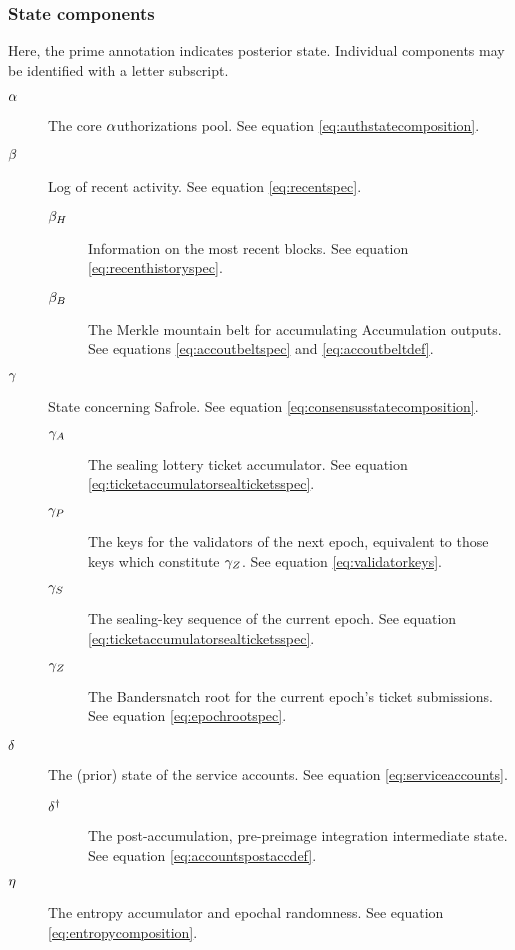 \subsubsection{State components}

Here, the prime annotation indicates posterior state. Individual components may be identified with a letter subscript.
\begin{description}
  \item[$\alpha$] The core $\alpha$uthorizations pool. See equation \ref{eq:authstatecomposition}.
  \item[$\beta$] Log of recent activity. See equation \ref{eq:recentspec}.
  \begin{description}
    \item[$\beta_H$] Information on the most recent blocks. See equation \ref{eq:recenthistoryspec}.
    \item[$\beta_B$] The Merkle mountain belt for accumulating Accumulation outputs. See equations \ref{eq:accoutbeltspec} and \ref{eq:accoutbeltdef}.
  \end{description}
  \item[$\gamma$] State concerning Safrole. See equation \ref{eq:consensusstatecomposition}.
  \begin{description}
    \item[$\gamma_A$] The sealing lottery ticket accumulator. See equation \ref{eq:ticketaccumulatorsealticketsspec}.
    \item[$\gamma_P$] The keys for the validators of the next epoch, equivalent to those keys which constitute $\gamma_Z$. See equation \ref{eq:validatorkeys}.
    \item[$\gamma_S$] The sealing-key sequence of the current epoch. See equation \ref{eq:ticketaccumulatorsealticketsspec}.
    \item[$\gamma_Z$] The Bandersnatch root for the current epoch's ticket submissions. See equation \ref{eq:epochrootspec}.
  \end{description}
  \item[$\delta$] The (prior) state of the service accounts. See equation \ref{eq:serviceaccounts}.
  \begin{description}
    \item[$\delta^\dagger$] The post-accumulation, pre-preimage integration intermediate state. See equation \ref{eq:accountspostaccdef}.
  \end{description}
  \item[$\eta$] The entropy accumulator and epochal randomness. See equation \ref{eq:entropycomposition}.

\end{description}
